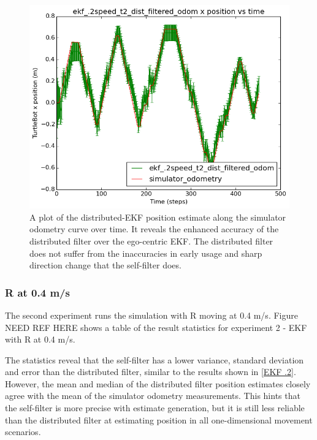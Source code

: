 \documentclass[conference]{IEEEtran} \usepackage[T1]{fontenc} \usepackage[backend=biber, style=ieee]{biblatex}
\begin{document}
\begin{figure}
\centering 
\includegraphics[scale=.45]{ekf_2speed_t2_dist_filtered_odom_pos_err_graph}
\caption {A plot of the distributed-EKF position estimate along the simulator odometry curve over time. It 
reveals the enhanced accuracy of the distributed filter over the ego-centric EKF. The distributed filter does not suffer 
from the inaccuracies in early usage and sharp direction change that the self-filter does.}
\label{pic5}
\end{figure}

\subsubsection{R at 0.4 m/s} \label{EKF .4}
The second experiment runs the simulation with R moving at 0.4 m/s. Figure NEED REF HERE shows a table of the result statistics for 
experiment 2 - EKF with R at 0.4 m/s. 


The statistics reveal that the self-filter has a lower variance, standard deviation and error than the distributed 
filter, similar to the results shown in \ref{EKF .2}. However, the mean and median of the distributed filter position estimates closely agree with 
the mean of the simulator odometry measurements. This hints that the self-filter is more precise with estimate generation, but it is 
still less reliable than the distributed filter at estimating position in all one-dimensional movement scenarios.
\end{document}
